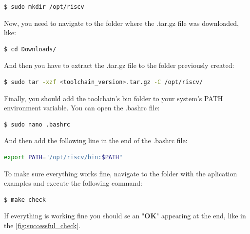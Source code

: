             \begin{lstlisting}[backgroundcolor = \color{lightgray}, language=bash]
                $ sudo mkdir /opt/riscv
            \end{lstlisting}
        
        Now, you need to navigate to the folder where the .tar.gz file was downloaded, like:
        
            \begin{lstlisting}[backgroundcolor = \color{lightgray}, language=bash]
                $ cd Downloads/
            \end{lstlisting}
            
        And then you have to extract the .tar.gz file to the folder previously created:
        
            \begin{lstlisting}[backgroundcolor = \color{lightgray}, language=bash]
                $ sudo tar -xzf <toolchain_version>.tar.gz -C /opt/riscv/
            \end{lstlisting}
            
        Finally, you should add the toolchain's bin folder to your system's PATH environment variable. You can open the .bashrc file:
        
            \begin{lstlisting}[backgroundcolor = \color{lightgray}, language=bash]
                $ sudo nano .bashrc
            \end{lstlisting}
            
        And then add the following line in the end of the .bashrc file:
        
            \begin{lstlisting}[backgroundcolor = \color{lightgray}, language=bash]
                export PATH="/opt/riscv/bin:$PATH"
            \end{lstlisting}
            
        To make sure everything works fine, navigate to the folder with the aplication examples and execute the following command:
        
            \begin{lstlisting}[backgroundcolor = \color{lightgray}, language=bash]
                $ make check
            \end{lstlisting}
        
        If everything is working fine you should se an "\textbf{OK}" appearing at the end, like in the \autoref{fig:successful_check}.
        
